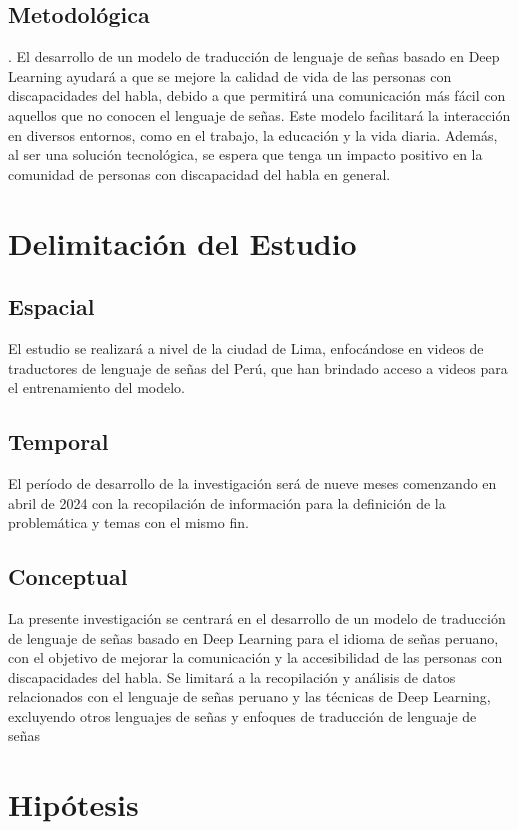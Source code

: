\subsection{Metodológica}. 
El desarrollo de un modelo de traducción de lenguaje de señas basado en Deep Learning ayudará a que se mejore la calidad de vida de las personas con discapacidades del habla, debido a que permitirá una comunicación más fácil con aquellos que no conocen el lenguaje de señas. Este modelo facilitará la interacción en diversos entornos, como en el trabajo, la educación y la vida diaria. Además, al ser una solución tecnológica, se espera que tenga un impacto positivo en la comunidad de personas con discapacidad del habla en general.

\section{Delimitación del Estudio}

\subsection{Espacial}
El estudio se realizará a nivel de la ciudad de Lima, enfocándose en videos de traductores de lenguaje de señas del Perú, que han brindado acceso a videos para el entrenamiento del modelo. 

\subsection{Temporal}
El período de desarrollo de la investigación será de nueve meses comenzando en abril de 2024 con la recopilación de información para la definición de la problemática y temas con el mismo fin.

\subsection{Conceptual}
La presente investigación se centrará en el desarrollo de un modelo de traducción de lenguaje de señas basado en Deep Learning para el idioma de señas peruano, con el objetivo de mejorar la comunicación y la accesibilidad de las personas con discapacidades del habla. Se limitará a la recopilación y análisis de datos relacionados con el lenguaje de señas peruano y las técnicas de Deep Learning, excluyendo otros lenguajes de señas y enfoques de traducción de lenguaje de señas

\section{Hipótesis}

